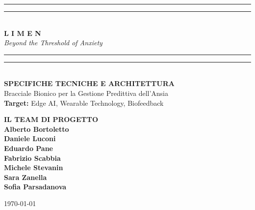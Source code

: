 \documentclass[12pt,a4paper]{article}
\begin{document}
\begin{titlepage}
    \centering
    \vspace*{1cm}
    
    \rule{\textwidth}{1.6pt}\vspace*{-\baselineskip}\vspace*{2pt}
    \rule{\textwidth}{0.4pt}\\[\baselineskip]
    
    {\Huge \textbf{\color{LimenDeep} L I M E N}} \\
    \vspace{0.5cm}
    {\Large \textit{Beyond the Threshold of Anxiety}} \\
    
    \rule{\textwidth}{0.4pt}\vspace*{-\baselineskip}\vspace*{2pt}
    \rule{\textwidth}{1.6pt}\\[2cm]
    
    {\Large \textbf{SPECIFICHE TECNICHE E ARCHITETTURA}} \\
    \vspace{0.5cm}
    {\large Bracciale Bionico per la Gestione Predittiva dell'Ansia} \\
    \vspace{0.3cm}
    {\normalsize \textbf{Target:} Edge AI, Wearable Technology, Biofeedback} \\
    
    \vfill

    \begin{minipage}{0.8\textwidth}
        \centering
        \textbf{\large IL TEAM DI PROGETTO} \\
        \vspace{0.5cm}
            \textbf{Alberto Bortoletto} \\
            \textbf{Daniele Luconi} \\
            \textbf{Eduardo Pane} \\
            \textbf{Fabrizio Scabbia} \\
            \textbf{Michele Stevanin} \\
            \textbf{Sara Zanella} \\            
            \textbf{Sofia Parsadanova} \\
    \end{minipage}

    \vfill
    {\large \today}
\end{titlepage}
\end{document}
